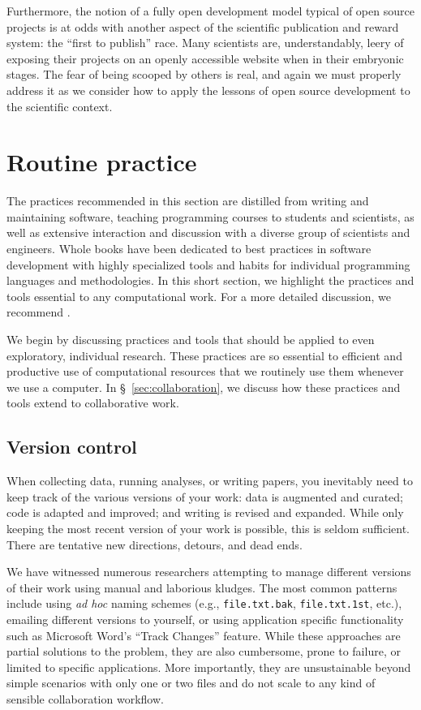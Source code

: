 \documentclass[11pt,oneside,english]{article}
\begin{document}
Furthermore, the notion of a fully open development model typical of open
source projects is at odds with another aspect of the scientific publication
and reward system: the ``first to publish'' race. Many scientists are,
understandably, leery of exposing their projects on an openly accessible
website when in their embryonic stages. The fear of being scooped by others is
real, and again we must properly address it as we consider how to apply the
lessons of open source development to the scientific context.

\section{\label{sec:practice}Routine practice}

The practices recommended in this section are distilled from writing and
maintaining software, teaching programming courses to students and scientists,
as well as extensive interaction and discussion with a diverse group of
scientists and engineers.  Whole books have been dedicated to best practices in
software development with highly specialized tools and habits for individual
programming languages and methodologies.  In this short section, we highlight
the practices and tools essential to any computational work. For a more
detailed discussion, we recommend
\cite{kernighan1999practice,HT00,2012arXiv1210.0530A}.

We begin by discussing practices and tools that should be applied to even
exploratory, individual research.  These practices are so essential to
efficient and productive use of computational resources that we routinely use
them whenever we use a computer. In §~\ref{sec:collaboration}, we discuss how these
practices and tools extend to collaborative work. 

\subsection{Version control}\label{subsec:vc}

When collecting data, running analyses, or writing papers, you inevitably need
to keep track of the various versions of your work: data is augmented and
curated; code is adapted and improved; and writing is revised and expanded.
While only keeping the most recent version of your work is possible,
this is seldom sufficient.  There are tentative new directions,
detours, and dead ends.

We have witnessed numerous researchers attempting to manage different versions
of their work using manual and laborious kludges. The most common patterns
include using \emph{ad hoc} naming schemes (e.g., \texttt{file.txt.bak},
\texttt{file.txt.1st}, etc.), emailing different versions to yourself, or using
application specific functionality such as Microsoft Word's ``Track
Changes'' feature.  While these approaches are partial solutions to the
problem, they are also cumbersome, prone to failure, or limited to specific
applications.  More importantly, they are unsustainable beyond simple
scenarios with only one or two files and do not scale to any kind of sensible
collaboration workflow.
\end{document}
